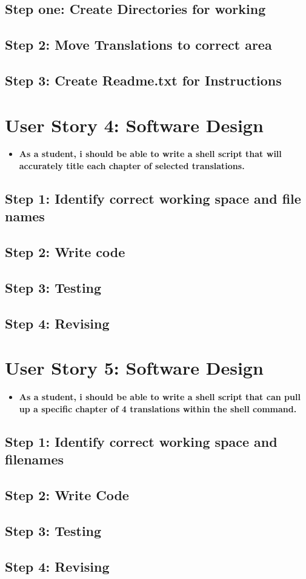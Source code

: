 \documentclass{article}
\begin{document}
\subsection{Step one: Create Directories for working}
\subsection{Step 2: Move Translations to correct area}
\subsection{Step 3: Create Readme.txt for Instructions}


\section{User Story 4: Software Design}
\begin{itemize}
\item{\textbf{As a student, i should be able to write a shell script that will accurately title each chapter of selected translations.}}
\end{itemize}
\subsection{Step 1: Identify correct working space and file names}
\subsection{Step 2: Write code}
\subsection{Step 3: Testing}
\subsection{Step 4: Revising}


\section{User Story 5: Software Design}
\begin{itemize}
\item{\textbf{As a student, i should be able to write a shell script that can pull up a specific chapter of 4 translations within the shell command.}}
\end{itemize}
\subsection{Step 1: Identify correct working space and filenames}
\subsection{Step 2: Write Code}
\subsection{Step 3: Testing}
\subsection{Step 4: Revising}
\end{document}

